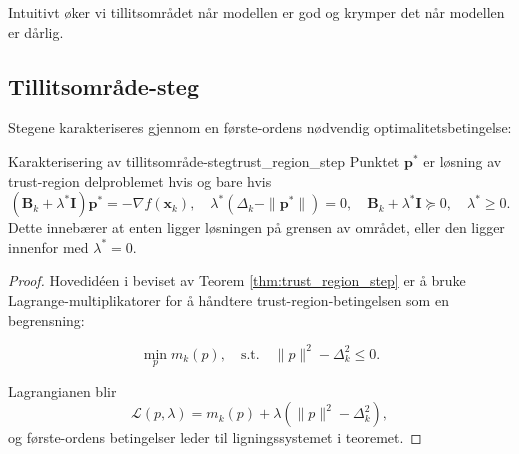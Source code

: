 \begin{algorithm}[H]
	\SetAlgoLined
	\caption{Intuitivt øker vi tillitsområdet når modellen er god og krymper det når modellen er dårlig.}
	\label{alg:trust_region_2}
\end{algorithm}

\subsection{Tillitsområde-steg}
Stegene karakteriseres gjennom en første-ordens nødvendig optimalitetsbetingelse:
\begin{theorem}{Karakterisering av tillitsområde-steg}{trust_region_step}
	Punktet $\symbf{p}^\ast$ er løsning av trust-region delproblemet hvis og bare hvis
	\[
		(\symbf{B}_k + \lambda^\ast \symbf{I})\symbf{p}^\ast = -\nabla f(\symbf{x}_k), \quad \lambda^\ast (\Delta_k - \|\symbf{p}^\ast\|) = 0, \quad \symbf{B}_k + \lambda^\ast \symbf{I} \succeq 0, \quad \lambda^\ast \ge 0.
	\]
	Dette innebærer at enten ligger løsningen på grensen av området, eller den ligger innenfor med $\lambda^\ast = 0$.
\end{theorem}

\begin{proof}{}{}
	Hovedidéen i beviset av Teorem \ref{thm:trust_region_step} er å bruke Lagrange-multiplikatorer for å håndtere trust-region-betingelsen som en begrensning:

	\[
		\min_p m_k(p), \quad \text{s.t.} \quad \|p\|^2 - \Delta_k^2 \leq 0.
	\]

	Lagrangianen blir
	\[
		\mathcal{L}(p,\lambda) = m_k(p) + \lambda(\|p\|^2 - \Delta_k^2),
	\]
	og første-ordens betingelser leder til ligningssystemet i teoremet.
\end{proof}

